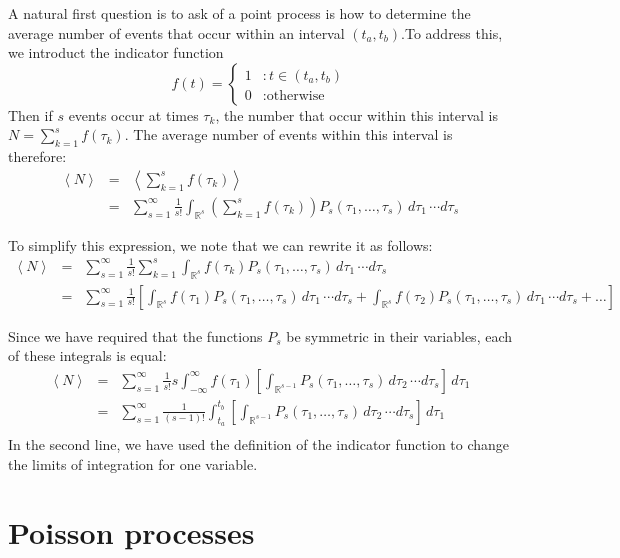 \documentclass{article}
\begin{document}
A natural first question is to ask of a point process is how to determine the average number of events that occur within an interval $(t_a,t_b)$.To address this, we introduct the indicator function
\[ f(t)= \left\{
     \begin{array}{lr}
       1 & : t \in (t_a,t_b)\\
       0 & :\textrm{otherwise}
     \end{array}
   \right. \]
Then if $s$ events occur at times $\tau_k$,  the number that occur within this interval is $N = \sum_{k=1}^s f(\tau_k)$. The average number of events within this interval is therefore:
\begin{eqnarray*}
\left< N \right> & = & \left< \sum_{k=1}^{s} f(\tau_k) \right>\\
& = & \sum_{s=1}^{\infty}  \frac{1}{s!} \int_{\mathbb{R}^{s}} \left( \sum_{k=1}^{s} f(\tau_k) \right) P_s(\tau_1,\ldots,\tau_s) \, d\tau_1 \, \cdots d\tau_s
\end{eqnarray*}

To simplify this expression, we note that we can rewrite it as follows:
\begin{eqnarray*}
\left< N \right> & = & \sum_{s=1}^{\infty}  \frac{1}{s!} \sum_{k=1}^{s} \int_{\mathbb{R}^{s}}  f(\tau_k) P_s(\tau_1,\ldots,\tau_s) \, d\tau_1 \, \cdots d\tau_s\\
& = & \sum_{s=1}^{\infty}   \frac{1}{s!}  \left[ \int_{\mathbb{R}^{s}}  f(\tau_1) P_s(\tau_1,\ldots,\tau_s) \, d\tau_1 \, \cdots d\tau_s + \int_{\mathbb{R}^{s}}  f(\tau_2) P_s(\tau_1,\ldots,\tau_s) \, d\tau_1 \, \cdots d\tau_s+ \ldots \right]
\end{eqnarray*}

Since we have required that the functions $P_s$ be symmetric in their variables, each of these integrals is equal:
\begin{eqnarray*}
\left< N \right>  & = & \sum_{s=1}^{\infty} \frac{1}{s!}  s \int_{-\infty}^{\infty} f(\tau_1) \left[  \int_{\mathbb{R}^{s-1}}  P_s(\tau_1,\ldots,\tau_s) \, d\tau_2 \, \cdots d\tau_s \right] \, d \tau_1\\
& = & \sum_{s=1}^{\infty} \frac{1}{(s-1)!}  \int_{t_a}^{t_b}  \left[  \int_{\mathbb{R}^{s-1}}  P_s(\tau_1,\ldots,\tau_s) \, d\tau_2 \, \cdots d\tau_s \right] \, d \tau_1\\
\end{eqnarray*}
In the second line, we have used the definition of the indicator function to change the limits of integration for one variable.

\section*{Poisson processes}
\end{document}
